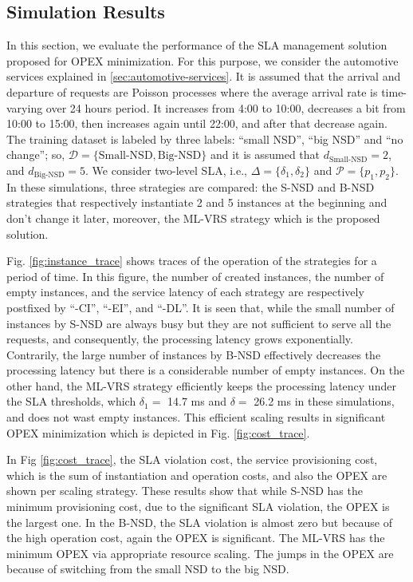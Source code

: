 \documentclass[conference, final]{IEEEtran}
\newcommand{\hlb}[2][blue]{{\color{#1} {#2}}\unskip }
\begin{document}
\subsection{Simulation Results}
\hlb{

In this section, we evaluate the performance of the SLA management solution proposed for OPEX minimization. For this purpose, we consider the automotive services explained in \ref{sec:automotive-services}. It is assumed that the arrival and departure of requests are Poisson processes where the average arrival rate is time-varying over 24 hours period.  It increases from 4:00 to 10:00, decreases a bit from 10:00 to 15:00, then increases again until 22:00, and after that decrease again. The training dataset is labeled by three labels: ``small NSD'', ``big NSD'' and ``no change''; so, $\mathcal{D}=\{\text{Small-NSD}, \text{Big-NSD}\}$ and it is assumed that $d_{\text{Small-NSD}} = 2$, and $d_{\text{Big-NSD}} = 5$. We consider two-level SLA, i.e., $\Delta=\{\delta_{1}, \delta_{2}\}$ and $\mathcal{P}=\{p_{1}, p_{2}\}$. In these simulations, three strategies are compared: the {\small \textsf{S-NSD}} and {\small \textsf{B-NSD}} strategies that respectively instantiate 2 and 5 instances at the beginning and don't change it later, moreover, the {\small \textsf{ML-VRS}} strategy which is the proposed solution.

Fig. \ref{fig:instance_trace} shows traces of the operation of the strategies for a period of time. In this figure, the number of created instances, the number of empty instances, and the service latency of each strategy are respectively postfixed by ``-CI'', ``-EI'', and ``-DL''. It is seen that, while the small number of instances by {\small \textsf{S-NSD}} are always busy but they are not sufficient to serve all the requests, and consequently, the processing latency grows exponentially. Contrarily, the large number of instances by {\small \textsf{B-NSD}} effectively decreases the processing latency but there is a considerable number of empty instances. On the other hand, the {\small \textsf{ML-VRS}} strategy efficiently keeps the processing latency under the SLA thresholds, which $\delta_{1} =$ 14.7 ms and $\delta =$ 26.2 ms in these simulations, and does not wast empty instances. This efficient scaling results in significant OPEX minimization which is depicted in Fig. \ref{fig:cost_trace}.

In Fig \ref{fig:cost_trace}, the SLA violation cost, the service provisioning cost, which is the sum of instantiation and operation costs, and also the OPEX are shown per scaling strategy. These results show that while {\small \textsf{S-NSD}} has the minimum provisioning cost, due to the significant SLA violation, the OPEX is the largest one. In the  {\small \textsf{B-NSD}}, the SLA violation is almost zero but because of the high operation cost, again the OPEX is significant. The {\small \textsf{ML-VRS}} has the minimum OPEX via appropriate resource scaling. The jumps in the OPEX are because of switching from the small NSD to the big NSD. 


}
\end{document}

